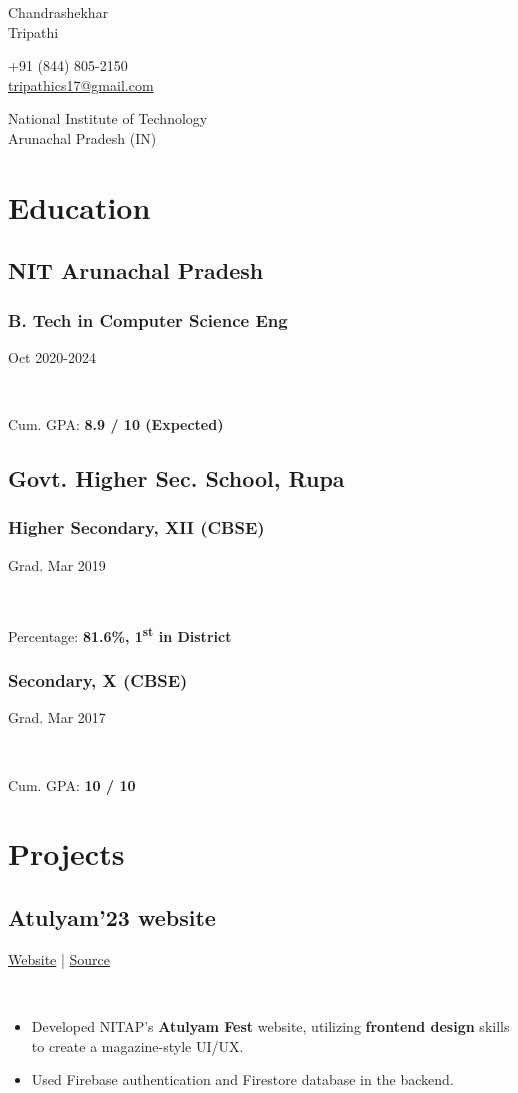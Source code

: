 \documentclass[]{article}
\newcommand{\namesection}[3]{
  \begin{multicols}{2}
    \begin{flushleft}
      \fontsize{30pt}{25pt}
      \fontspec[Path = fonts/ZillaSlab/]{ZillaSlab-Light}
      {{ #1 }\\{ #2 }}
      \columnbreak\\
    \end{flushleft}
    \begin{flushright}
      { #3 }
    \end{flushright}
  \end{multicols}
  \vspace{-8pt}
}
\newcommand{\subheading}[2]{
  {\subsection{#1}
  \hfill{#2}}\\
  \vspace{2pt}
}
\newcommand{\subsubheading}[2]{
  {\subsubsection{#1}
  \hfill \small#2} \\
  \vspace{2pt}
}
\newenvironment{tightemize}{
\vspace{-4pt}
\begin{itemize}
  \itemsep3pt \parskip0pt \parsep0pt}
{\end{itemize}\vspace{-\topsep}}
\begin{document}
\namesection{Chandrashekhar}{Tripathi}{+91 (844) 805-2150\\
  \href{mailto:tripathics17@gmail.com}{tripathics17@gmail.com}
  \par
  National Institute of Technology\\
  Arunachal Pradesh (IN)}

\noindent\makebox[\linewidth]{\color{light}\rule{\paperwidth}{0.2pt}}
\vspace{-5pt}

\begin{multicols}{2}
  \begin{flushleft}
    \section{Education}    
    \subsection{NIT Arunachal Pradesh}
    \subsubheading{B. Tech in Computer Science Eng}{Oct 2020-2024}
    Cum. GPA: \textbf{8.9 / 10 (Expected)}

    \subsection{Govt. Higher Sec. School, Rupa}
    \subsubheading{Higher Secondary, XII (CBSE)}{Grad. Mar 2019}
    Percentage: \textbf{81.6\%, 1\textsuperscript{st} in District}

    \subsubheading{Secondary, X (CBSE)}{Grad. Mar 2017}
    Cum. GPA: \textbf{10 / 10}

    \section{Projects}

    \subheading{Atulyam'23 website}{
      \href{https://atulyam23.com}{Website} | 
      \href{https://github.com/tripathics/atulyam-2023}{Source} 
    }
    \begin{tightemize}
      \item Developed NITAP's \textbf{Atulyam Fest} website, utilizing \textbf{frontend design} skills to create a magazine-style UI/UX.
      \item Used Firebase authentication and Firestore database in the backend.
    \end{tightemize}


\end{flushleft}
\end{multicols}
\end{document}
